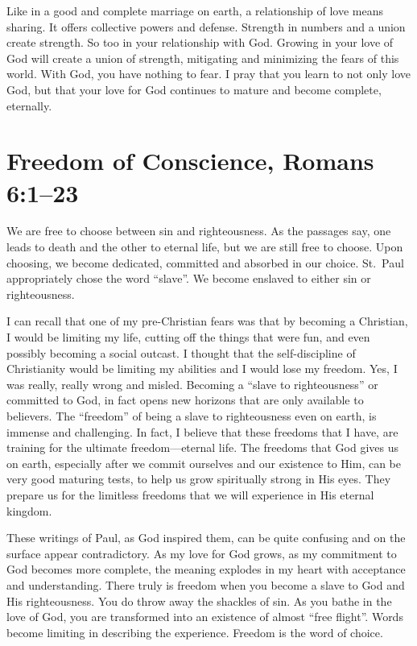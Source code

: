 \documentclass[12pt]{memoir}
\begin{document}
Like in a good and complete marriage on earth, a relationship of love
means sharing. It offers collective powers and defense. Strength in
numbers and a union create strength. So too in your relationship
with God. Growing in your love of God will create a union of strength,
mitigating and minimizing the fears of this world. With God, you have
nothing to fear. I pray that you learn to not only love God, but that
your love for God continues to mature and become complete, eternally.

\section[Freedom of Conscience]{Freedom of Conscience, Romans 6:1--23}

We are free to choose between sin and righteousness. As the passages
say, one leads to death and the other to eternal life, but we are
still free to choose.
Upon choosing, we become dedicated, committed
and absorbed in our choice. St.~Paul appropriately chose the word
``slave''. We become enslaved to either sin or righteousness. 

I can recall that one of my pre-Christian fears was that by becoming
a Christian, I would be limiting my life, cutting off the things that
were fun, and even possibly becoming a social outcast. I thought that
the self-discipline of Christianity would be limiting my abilities
and I would lose my freedom. Yes, I was really, really wrong and misled.
Becoming a ``slave to righteousness'' or committed to God, in fact
opens new horizons that are only available to believers. The ``freedom''
of being a slave to righteousness even on earth, is immense and challenging.
In fact, I believe that these freedoms that I have, are training for the ultimate freedom---eternal life. The freedoms that God gives us
on earth, especially after we commit ourselves and our existence to Him, can be very good maturing tests, to help us grow spiritually strong in His eyes. They prepare us for the limitless freedoms that we will experience in His eternal kingdom. 

These writings of Paul, as God inspired them, can be quite confusing and on the surface appear contradictory. As my love for God grows, as my commitment to God becomes more complete, the meaning explodes in my heart with acceptance and understanding. There truly is freedom when you become a slave to God and His righteousness. You do throw away the shackles of sin. As you bathe in the love of God, you are transformed into an existence of almost ``free flight''. Words become
limiting in describing the experience. Freedom is the word of choice. 
\end{document}
